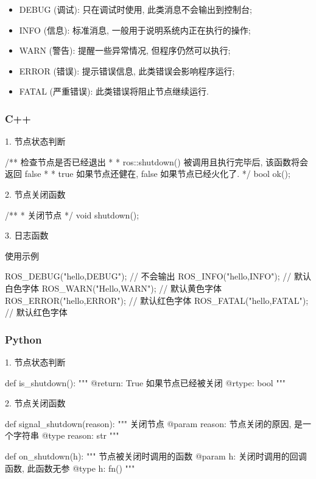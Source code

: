 \documentclass[openany, fontset=windowsold]{ctexbook}
\theoremstyle{kaiti}
\theoremstyle{normal}
\begin{document}
\begin{itemize}
  \item DEBUG (调试): 只在调试时使用, 此类消息不会输出到控制台; 
  \item INFO (信息): 标准消息, 一般用于说明系统内正在执行的操作; 
  \item WARN (警告): 提醒一些异常情况, 但程序仍然可以执行; 
  \item ERROR (错误): 提示错误信息, 此类错误会影响程序运行; 
  \item FATAL (严重错误): 此类错误将阻止节点继续运行.
\end{itemize}

\subsubsection{C++}

1. 节点状态判断

\begin{cpp}
  /** \brief 检查节点是否已经退出
   *
   *  ros::shutdown() 被调用且执行完毕后, 该函数将会返回 false
   *
   * \return true 如果节点还健在, false 如果节点已经火化了.
   */
  bool ok();
\end{cpp}

2. 节点关闭函数

\begin{cpp}
  /**
   *   关闭节点
   */
  void shutdown();
\end{cpp}

3. 日志函数

使用示例

\begin{cpp}
  ROS_DEBUG("hello,DEBUG"); // 不会输出
  ROS_INFO("hello,INFO");   // 默认白色字体
  ROS_WARN("Hello,WARN");   // 默认黄色字体
  ROS_ERROR("hello,ERROR"); // 默认红色字体
  ROS_FATAL("hello,FATAL"); // 默认红色字体
\end{cpp}

\subsubsection{Python}

1. 节点状态判断

\begin{python}
  def is_shutdown():
      """
      @return: True 如果节点已经被关闭
      @rtype: bool
      """
\end{python}

2. 节点关闭函数

\begin{python}
  def signal_shutdown(reason):
      """
      关闭节点
      @param reason: 节点关闭的原因, 是一个字符串
      @type  reason: str
      """

  def on_shutdown(h):
      """
      节点被关闭时调用的函数
      @param h: 关闭时调用的回调函数, 此函数无参
      @type  h: fn()
      """
\end{python}
\end{document}
